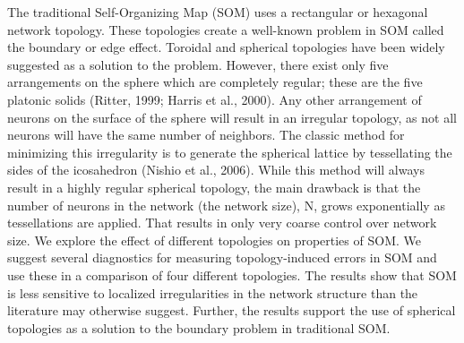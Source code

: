 The traditional Self-Organizing Map (SOM) uses a rectangular or hexagonal
network topology.  These topologies create a well-known problem in SOM called
the boundary or edge effect.  Toroidal and spherical topologies have been widely
suggested as a solution to the problem.  However, there exist only five
arrangements on the sphere which are completely regular; these are the five
platonic solids (Ritter, 1999; Harris et al., 2000).  Any other arrangement of
neurons on the surface of the sphere will result in an irregular topology, as
not all neurons will have the same number of neighbors. The classic method for
minimizing this irregularity is to generate the spherical lattice by
tessellating the sides of the icosahedron (Nishio et al., 2006). While this
method will always result in a highly regular spherical topology, the main
drawback is that the number of neurons in the network (the network size), N,
grows exponentially as tessellations are applied. That results in only very
coarse control over network size.  We explore the effect of different topologies
on properties of SOM. We suggest several diagnostics for measuring
topology-induced errors in SOM and use these in a comparison of four different
topologies. The results show that SOM is less sensitive to localized
irregularities in the network structure than the literature may otherwise
suggest.  Further, the results support the use of spherical topologies as a
solution to the boundary problem in traditional SOM.
